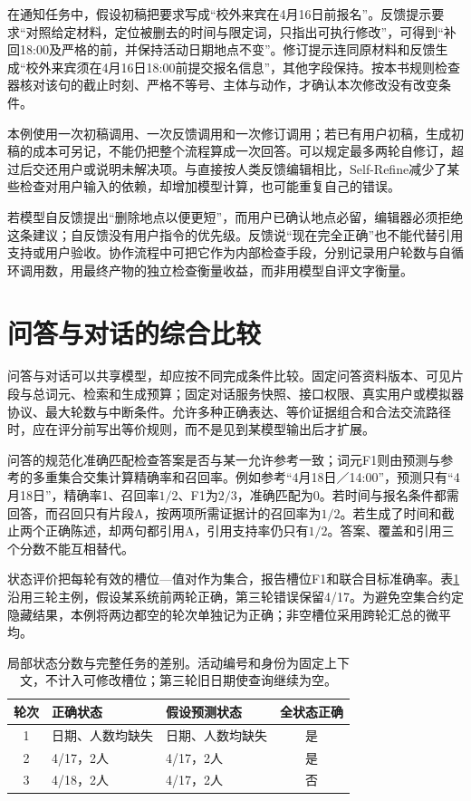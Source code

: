 在通知任务中，假设初稿把要求写成“校外来宾在4月16日前报名”。反馈提示要求“对照给定材料，定位被删去的时间与限定词，只指出可执行修改”，可得到“补回18:00及严格的前，并保持活动日期地点不变”。修订提示连同原材料和反馈生成“校外来宾须在4月16日18:00前提交报名信息”，其他字段保持。按本书规则检查器核对该句的截止时刻、严格不等号、主体与动作，才确认本次修改没有改变条件。

本例使用一次初稿调用、一次反馈调用和一次修订调用；若已有用户初稿，生成初稿的成本可另记，不能仍把整个流程算成一次回答。可以规定最多两轮自修订，超过后交还用户或说明未解决项。与直接按人类反馈编辑相比，Self-Refine减少了某些检查对用户输入的依赖，却增加模型计算，也可能重复自己的错误。

若模型自反馈提出“删除地点以便更短”，而用户已确认地点必留，编辑器必须拒绝这条建议；自反馈没有用户指令的优先级。反馈说“现在完全正确”也不能代替引用支持或用户验收。协作流程中可把它作为内部检查手段，分别记录用户轮数与自循环调用数，用最终产物的独立检查衡量收益，而非用模型自评文字衡量。

\section{问答与对话的综合比较}
\label{sec:nlp-dialogue-comparison}

问答与对话可以共享模型，却应按不同完成条件比较。固定问答资料版本、可见片段与总词元、检索和生成预算；固定对话服务快照、接口权限、真实用户或模拟器协议、最大轮数与中断条件。允许多种正确表达、等价证据组合和合法交流路径时，应在评分前写出等价规则，而不是见到某模型输出后才扩展。

问答的规范化准确匹配检查答案是否与某一允许参考一致；词元F1则由预测与参考的多重集合交集计算精确率和召回率。例如参考“4月18日／14:00”，预测只有“4月18日”，精确率1、召回率$1/2$、F1为$2/3$，准确匹配为0。若时间与报名条件都需回答，而召回只有片段A，按两项所需证据计的召回率为$1/2$。若生成了时间和截止两个正确陈述，却两句都引用A，引用支持率仍只有$1/2$。答案、覆盖和引用三个分数不能互相替代。

状态评价把每轮有效的槽位—值对作为集合，报告槽位F1和联合目标准确率。表\ref{tab:nlp-dialogue-metrics}沿用三轮主例，假设某系统前两轮正确，第三轮错误保留4/17。为避免空集合约定隐藏结果，本例将两边都空的轮次单独记为正确；非空槽位采用跨轮汇总的微平均。

\begin{table}[htbp]
\centering
\begin{tabular}{cllc}
\toprule
轮次 & 正确状态 & 假设预测状态 & 全状态正确\\
\midrule
1 & 日期、人数均缺失 & 日期、人数均缺失 & 是\\
2 & 4/17，2人 & 4/17，2人 & 是\\
3 & 4/18，2人 & 4/17，2人 & 否\\
\bottomrule
\end{tabular}
\caption{局部状态分数与完整任务的差别。活动编号和身份为固定上下文，不计入可修改槽位；第三轮旧日期使查询继续为空。}
\label{tab:nlp-dialogue-metrics}
\end{table}

